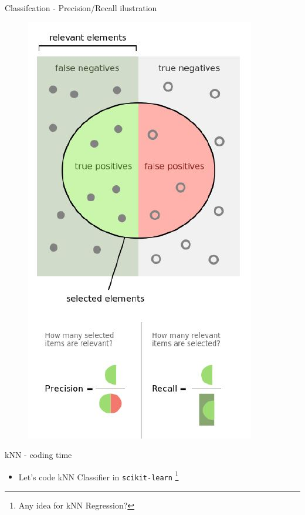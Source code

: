 \documentclass[aspectratio=169]{beamer}
\begin{document}
\begin{frame}{Classifcation - Precision/Recall ilustration}
   \begin{figure}
       \includegraphics[scale=0.4]{./images/prec_rec.JPG}
   \end{figure}
\end{frame}
\begin{frame}{kNN - coding time}
    \begin{itemize}
        \item Let's code kNN Classifier in \texttt{scikit-learn} 
        \footnote{Any idea for kNN Regression?}
    \end{itemize}
\end{frame}
\end{document}
